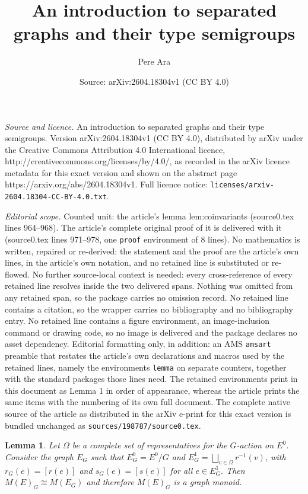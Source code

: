 \documentclass[10pt,a4paper]{amsart}
\title{An introduction to separated graphs and their type semigroups}
\author{Pere Ara}
\date{Source: arXiv:2604.18304v1 (CC BY 4.0)}
\newtheorem{lemma}{Lemma}
\begin{document}
\maketitle

\noindent\emph{Source and licence.} An introduction to separated graphs and their type semigroups. Version arXiv:2604.18304v1 (CC BY 4.0), distributed by arXiv under the Creative Commons Attribution 4.0 International licence, http://creativecommons.org/licenses/by/4.0/, as recorded in the arXiv licence metadata for this exact version and shown on the abstract page https://arxiv.org/abs/2604.18304v1. Full licence notice: \texttt{licenses/arxiv-2604.18304-CC-BY-4.0.txt}.\par\smallskip

\noindent\textit{Editorial scope.} Counted unit: the article's lemma lem:coinvariants (source0.tex lines 964--968). The article's complete original proof of it is delivered with it (source0.tex lines 971--978, one \texttt{proof} environment of 8 lines). No mathematics is written, repaired or re-derived: the statement and the proof are the article's own lines, in the article's own notation, and no retained line is substituted or re-flowed.  No further source-local context is needed: every cross-reference of every retained line resolves inside the two delivered spans.  Nothing was omitted from any retained span, so the package carries no omission record.  No retained line contains a citation, so the wrapper carries no bibliography and no bibliography entry.  No retained line contains a figure environment, an image-inclusion command or drawing code, so no image is delivered and the package declares no asset dependency.  Editorial formatting only, in addition: an AMS \texttt{amsart} preamble that restates the article's own declarations and macros used by the retained lines, namely the environments \texttt{lemma} on separate counters, together with the standard packages those lines need.  The retained environments print in this document as Lemma 1 in order of appearance, whereas the article prints the same items with the numbering of its own full document.  The complete native source of the article as distributed in the arXiv e-print for this exact version is bundled unchanged as \texttt{sources/198787/source0.tex}.
\begin{lemma}
	\label{lem:coinvariants}
	Let $\Omega$ be a complete set of representatives for the $G$-action on $E^0$.
	Consider the graph $E_G$ such that $E_G^0=E^0/G$ and $E_G^1 = \bigsqcup_{v\in \Omega} r^{-1} (v)$, with $r_G(e)=[r(e)]$ and $s_G(e) = [s(e)]$ for all $e\in E_G^1$. Then $M(E)_G\cong M(E_G)$ and therefore $M(E)_G$ is a graph monoid.
\end{lemma}
\end{document}
